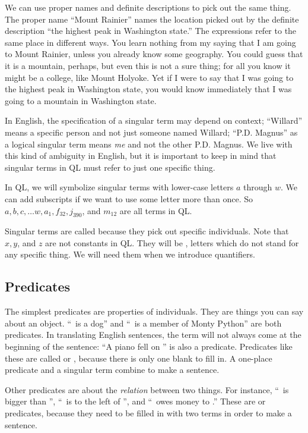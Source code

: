 We can use proper names and definite descriptions to pick out the same thing. The proper name ``Mount Rainier'' names the location picked out by the definite description ``the highest peak in Washington state.'' The expressions refer to the same place in different ways. You learn nothing from my saying that I am going to Mount Rainier, unless you already know some geography. You could guess that it is a mountain, perhaps, but even this is not a sure thing; for all you know it might be a college, like Mount Holyoke. Yet if I were to say that I was going to the highest peak in Washington state, you would know immediately that I was going to a mountain in Washington state.

In English, the specification of a singular term may depend on context; ``Willard'' means a specific person and not just someone named Willard; ``P.D. Magnus'' as a logical singular term means \emph{me} and not the other P.D. Magnus. We live with this kind of ambiguity in English, but it is important to keep in mind that singular terms in QL must refer to just one specific thing.

In QL, we will symbolize singular terms with lower-case letters $a$ through $w$. We can add subscripts if we want to use some letter more than once. So $a,b,c,\ldots w, a_1, f_{32}, j_{390}$, and $m_{12}$ are all terms in QL.

Singular terms are called  because they pick out specific individuals. Note that $x, y$, and $z$ are not constants in QL. They will be , letters which do not stand for any specific thing. We will need them when we introduce quantifiers.

\subsection{Predicates}


The simplest predicates are properties of individuals. They are things you can say about an object. ``\blank\ is a dog'' and ``\blank\ is a member of Monty Python'' are both predicates. In translating English sentences, the term will not always come at the beginning of the sentence: ``A piano fell on \blank'' is also a predicate. Predicates like these are called  or , because there is only one blank to fill in. A one-place predicate and a singular term combine to make a sentence.

Other predicates are about the \emph{relation} between two things. For instance, ``\blank\ is bigger than \blank'', ``\blank\ is to the left of \blank'', and ``\blank\ owes money to \blank.'' These are  or  predicates, because they need to be filled in with two terms in order to make a sentence.

